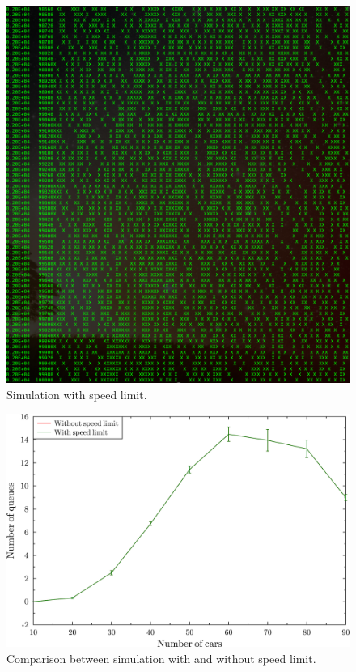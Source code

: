 \documentclass[a4paper,12pt]{article}
\begin{document}
\begin{enumerate}
\begin{figure}[h]
\centering
\includegraphics[width=\columnwidth]{limit.png}
\caption{Simulation with speed limit.}
\label{pic:limit}
\end{figure}

\begin{figure}[h]
\centering
\includegraphics[width=0.7\columnwidth]{speedlim.png}
\caption{Comparison between simulation with and without speed limit.}
\label{pic:speedlimit}
\end{figure}

\end{enumerate}
\end{document}
